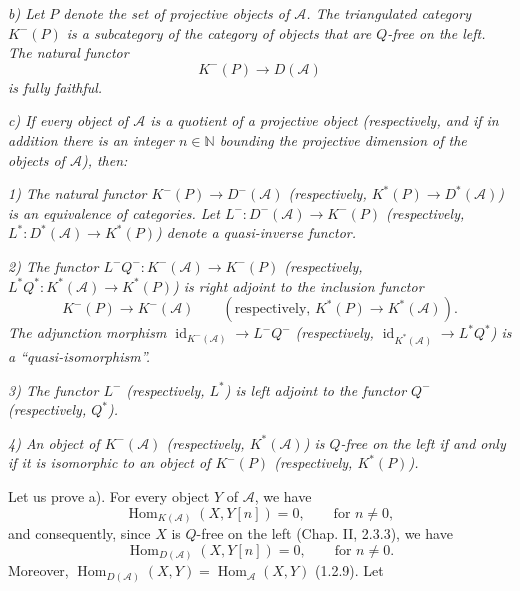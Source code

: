\clearpage
{}%
\begingroup\small\setlength{\parskip}{0pt}\setlength{\emergencystretch}{1.5em}
\setlength{\abovedisplayskip}{4pt plus 2pt minus 2pt}%
\setlength{\belowdisplayskip}{4pt plus 2pt minus 2pt}%

\noindent\textit{b) Let $P$ denote the set of projective objects of
$\mathcal A$. The triangulated category $K^{-}(P)$ is a subcategory of the
category of objects that are $Q$-free on the left. The natural functor}
\[
K^{-}(P)\longrightarrow D(\mathcal A)
\]
\noindent\textit{is fully faithful.}

\noindent\textit{c) If every object of $\mathcal A$ is a quotient of a
projective object (respectively, and if in addition there is an integer
$n\in\mathbb N$ bounding the projective dimension of the objects of
$\mathcal A$), then:}

\noindent\textit{1) The natural functor
$K^{-}(P)\longrightarrow D^{-}(\mathcal A)$ (respectively,
$K^{*}(P)\longrightarrow D^{*}(\mathcal A)$) is an equivalence of
categories. Let
$L^{-}\colon D^{-}(\mathcal A)\longrightarrow K^{-}(P)$ (respectively,
$L^{*}\colon D^{*}(\mathcal A)\longrightarrow K^{*}(P)$) denote a
quasi-inverse functor.}

\noindent\textit{2) The functor
$L^{-}Q^{-}\colon K^{-}(\mathcal A)\longrightarrow K^{-}(P)$
(respectively,
$L^{*}Q^{*}\colon K^{*}(\mathcal A)\longrightarrow K^{*}(P)$) is right
adjoint to the inclusion functor}
\[
K^{-}(P)\longrightarrow K^{-}(\mathcal A)
\qquad
(\text{respectively, }K^{*}(P)\longrightarrow K^{*}(\mathcal A)).
\]
\noindent\textit{The adjunction morphism
$\operatorname{id}_{K^{-}(\mathcal A)}\longrightarrow L^{-}Q^{-}$
(respectively,
$\operatorname{id}_{K^{*}(\mathcal A)}\longrightarrow L^{*}Q^{*}$) is a
``quasi-isomorphism''.}

\noindent\textit{3) The functor $L^{-}$ (respectively, $L^{*}$) is left
adjoint to the functor $Q^{-}$ (respectively, $Q^{*}$).}

\noindent\textit{4) An object of $K^{-}(\mathcal A)$ (respectively,
$K^{*}(\mathcal A)$) is $Q$-free on the left if and only if it is
isomorphic to an object of $K^{-}(P)$ (respectively, $K^{*}(P)$).}

Let us prove a). For every object $Y$ of $\mathcal A$, we have
\[
\operatorname{Hom}_{K(\mathcal A)}(X,Y[n])=0,
\qquad\text{for }n\neq0,
\]
and consequently, since $X$ is $Q$-free on the left (Chap. II, 2.3.3),
we have
\[
\operatorname{Hom}_{D(\mathcal A)}(X,Y[n])=0,
\qquad\text{for }n\neq0.
\]
Moreover,
$\operatorname{Hom}_{D(\mathcal A)}(X,Y)
=\operatorname{Hom}_{\mathcal A}(X,Y)$ (1.2.9). Let

